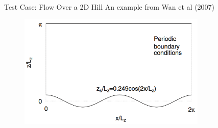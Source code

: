 \begin{frame}{Test Case: Flow Over a 2D Hill}
An example from Wan et al (2007) 
\begin{figure}
\includegraphics[width=0.8\textwidth]{compare15}
\end{figure}
\end{frame}

